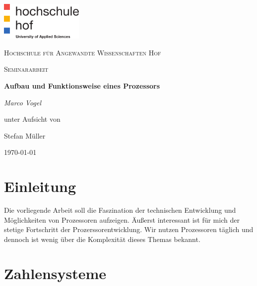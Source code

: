 \documentclass[a4paper,12pt]{article}
\begin{document}
\begin{titlepage}
	\centering
	\includegraphics[width=0.3\textwidth]{logo}\par\vspace{1cm}
	{\scshape\LARGE Hochschule für Angewandte Wissenschaften Hof \par}
	\vspace{1cm}
	{\scshape\Large Seminararbeit\par}
	\vspace{1.5cm}
	{\huge\bfseries Aufbau und Funktionsweise eines Prozessors\par}
	\vspace{2cm}
	{\Large\itshape Marco Vogel\par}
	\vfill
	unter Aufsicht von\par
	Stefan Müller
	\vfill
	{\large\today\par}
\end{titlepage}
\newpage

\pagestyle{empty} 
\tableofcontents
\newpage
\pagestyle{fancy}
\fancyhf{}
\fancyhead[L]{\rightmark}
\fancyhead[R]{\thepage}
\renewcommand{\headrulewidth}{1pt}
\setlength{\footnotemargin}{0pt}
\setcounter{page}{1}

\section{Einleitung}
Die vorliegende Arbeit soll die Faszination der technischen Entwicklung und Möglichkeiten von Prozessoren aufzeigen. Äußerst interessant ist für mich der stetige Fortschritt der Prozerssorentwicklung. Wir nutzen Prozessoren täglich und dennoch ist wenig über die Komplexität dieses Themas bekannt.

\section{Zahlensysteme}
\end{document}
